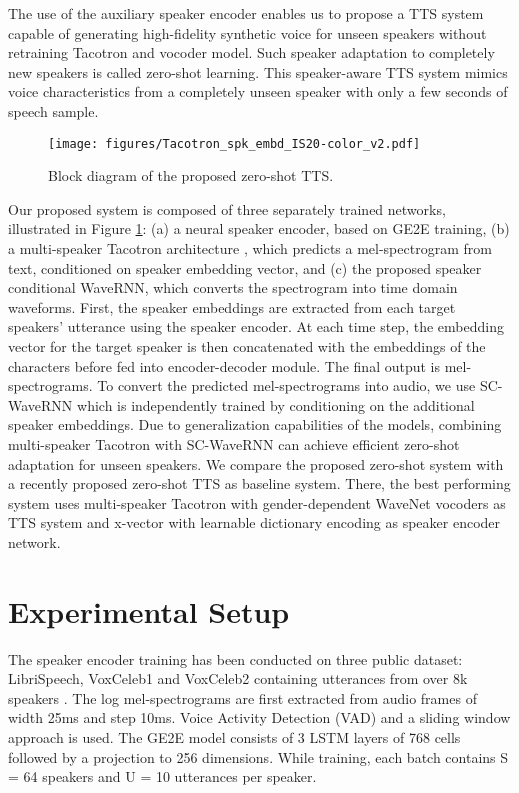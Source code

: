\documentclass[a4paper]{article}
\begin{document}
The use of the auxiliary speaker encoder enables us to propose a TTS system capable of generating high-fidelity synthetic voice for unseen speakers without retraining Tacotron and vocoder model. Such speaker adaptation to completely new speakers is called zero-shot learning. This speaker-aware TTS system mimics voice characteristics from a completely unseen speaker with only a few seconds of speech sample.

\begin{figure}[h!]
  \begin{center}
  \vspace{-4mm}
    \texttt{[image: figures/Tacotron\_spk\_embd\_IS20-color\_v2.pdf]}
    \vspace{-10mm}
  \end{center}
  \caption{\small Block diagram of the proposed zero-shot TTS.}
  \vspace{-3mm}
  \label{tts}
\end{figure}

Our proposed system is composed of three separately trained networks, illustrated in Figure \ref{tts}: (a) a neural speaker encoder, based on GE2E training, (b) a multi-speaker Tacotron  architecture \cite{wang2017tacotron}, which predicts a mel-spectrogram from text, conditioned on speaker embedding vector, and (c) the proposed speaker conditional WaveRNN, which converts the spectrogram into time domain waveforms. First, the speaker embeddings are extracted from each target speakers' utterance using the speaker encoder. At each time step, the embedding vector for the target speaker is then concatenated with the embeddings of the characters before fed into encoder-decoder module. The final output is mel-spectrograms. To convert the predicted mel-spectrograms into audio, we use SC-WaveRNN which is independently trained by conditioning on the additional speaker embeddings. Due to generalization capabilities of the models, combining multi-speaker Tacotron with SC-WaveRNN can achieve efficient zero-shot adaptation for unseen speakers. We compare the proposed zero-shot system with a recently proposed zero-shot TTS \cite{cooper2019zero} as baseline system. There, the best performing system uses multi-speaker Tacotron with gender-dependent WaveNet vocoders as TTS system and x-vector with learnable dictionary
encoding as speaker encoder network.

\vspace{-3mm}
\section{Experimental Setup}
The speaker encoder training has been conducted on three public dataset: LibriSpeech, VoxCeleb1 and VoxCeleb2 containing utterances from over 8k speakers \cite{jia2018transfer}. The log mel-spectrograms are first extracted from audio frames of width 25ms and step 10ms. Voice Activity Detection (VAD) and a
sliding window approach is used. The GE2E model consists of 3 LSTM layers of 768 cells followed by a projection to 256 dimensions. While training, each batch contains S = 64 speakers and U = 10 utterances per speaker.
\end{document}
